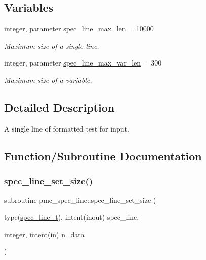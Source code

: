 \subsection*{Variables}
\begin{DoxyCompactItemize}
\item 
integer, parameter \mbox{\hyperlink{namespacepmc__spec__line_ae50dbe2c181c483be6cfc87cd3a217d0}{spec\+\_\+line\+\_\+max\+\_\+len}} = 10000
\begin{DoxyCompactList}\small\item\em Maximum size of a single line. \end{DoxyCompactList}\item 
integer, parameter \mbox{\hyperlink{namespacepmc__spec__line_a54f3958fcd2d7924fc1b9659e5442876}{spec\+\_\+line\+\_\+max\+\_\+var\+\_\+len}} = 300
\begin{DoxyCompactList}\small\item\em Maximum size of a variable. \end{DoxyCompactList}\end{DoxyCompactItemize}


\subsection{Detailed Description}
A single line of formatted test for input. 

\subsection{Function/\+Subroutine Documentation}
\mbox{\label{namespacepmc__spec__line_a1db0d0ef2b767a6540419a294120851e}} 
\subsubsection{\texorpdfstring{spec\+\_\+line\+\_\+set\+\_\+size()}{spec\_line\_set\_size()}}
{\footnotesize\ttfamily subroutine pmc\+\_\+spec\+\_\+line\+::spec\+\_\+line\+\_\+set\+\_\+size (\begin{DoxyParamCaption}\item[{type(\mbox{\hyperlink{structpmc__spec__line_1_1spec__line__t}{spec\+\_\+line\+\_\+t}}), intent(inout)}]{spec\+\_\+line,  }\item[{integer, intent(in)}]{n\+\_\+data }\end{DoxyParamCaption})}



